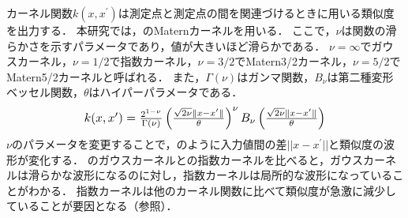 \documentclass[twocolumn]{ltjarticle}
\begin{document}
カーネル関数\(k(x, x^{\prime})\)は測定点と測定点の間を関連づけるときに用いる類似度を出力する．
本研究では，のMaternカーネルを用いる．
ここで，\(\nu\)は関数の滑らかさを示すパラメータであり，値が大きいほど滑らかである．
\(\nu=\infty\)でガウスカーネル，\(\nu=1/2\)で指数カーネル，\(\nu=3/2\)でMatern3/2カーネル，\(\nu=5/2\)でMatern5/2カーネルと呼ばれる．
また，\(\Gamma (\nu)\)はガンマ関数，\(B_{\nu}\)は第二種変形ベッセル関数，\(\theta\)はハイパーパラメータである．
\begin{align}
	\scalebox{1.1}{
		\(
		k(x, x^{\prime}) = \frac{2^{1-\nu}}{\Gamma (\nu)}\left(\frac{\sqrt{2\nu}\Vert x - x^{\prime} \Vert}{\theta}\right)^{\nu} B_{\nu} \left(\frac{\sqrt{2 \nu} \Vert x - x^{\prime} \Vert}{\theta}\right) \label{eq:matern}
		\)
	}
\end{align}
\(\nu\)のパラメータを変更することで，のように入力値間の差\(||x-x^{\prime}||\)と類似度の波形が変化する．
のガウスカーネルとの指数カーネルを比べると，ガウスカーネルは滑らかな波形になるのに対し，指数カーネルは局所的な波形になっていることがわかる．
指数カーネルは他のカーネル関数に比べて類似度が急激に減少していることが要因となる（参照）．
\setlength\intextsep{6pt}
\setlength\textfloatsep{6pt}
\end{document}
